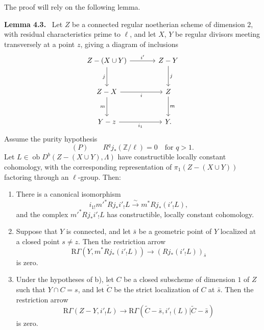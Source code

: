 \documentclass[11pt]{article}
\newenvironment{statement}[1]{\par\medskip\noindent\textbf{#1.}\ }{\par\medskip}
\providecommand{\Ob}{\operatorname{ob}}
\providecommand{\Ob}{\operatorname{ob}}
\providecommand{\Ob}{\operatorname{Ob}}
\providecommand{\Ob}{\operatorname{ob}}
\providecommand{\Ob}{\operatorname{Ob}}
\begin{document}
The proof will rely on the following lemma.

\label{sga5:IIIB:lemma:4.3}\begin{statement}{Lemma 4.3}
Let $Z$ be a connected regular noetherian scheme of dimension $2$, with residual characteristics prime to $\ell$, and let $X$, $Y$ be regular divisors meeting transversely at a point $z$, giving a diagram of inclusions
\[
\begin{tikzcd}[column sep=large,row sep=large]
Z-(X\cup Y) \arrow[r,"i'"] \arrow[d,"j"'] & Z-Y \arrow[d,"j"]\\
Z-X \arrow[r,"i"'] \arrow[d,"m"'] & Z \arrow[d,"m"]\\
Y-z \arrow[r,"i_1"'] & Y .
\end{tikzcd}
\]
Assume the purity hypothesis
\[
(P)\qquad R^qj_*(\mathbb Z/\ell)=0\quad\text{for }q>1.
\]
Let $L\in\Ob D^b(Z-(X\cup Y),\Lambda)$ have constructible locally constant cohomology, with the corresponding representation of $\pi_1(Z-(X\cup Y))$ factoring through an $\ell$-group. Then:
\begin{enumerate}[label=\alph*)]
\item There is a canonical isomorphism
\[
i_{1!}m'^*Rj_*i'_!L\xrightarrow{\sim} m^*Rj_*(i'_!L),
\]
and the complex $m'^*Rj_*i'_!L$ has constructible, locally constant cohomology.
\item Suppose that $Y$ is connected, and let $\bar s$ be a geometric point of $Y$ localized at a closed point $s\ne z$. Then the restriction arrow
\begin{equation}
\mathrm R\Gamma(Y,m^*Rj_*(i'_!L))\longrightarrow (Rj_*(i'_!L))_{\bar s}
\tag{4.3.1}\label{sga5:IIIB:equation:4.3.1}
\end{equation}
is zero.
\item Under the hypotheses of b), let $C$ be a closed subscheme of dimension $1$ of $Z$ such that $Y\cap C=s$, and let $\widetilde C$ be the strict localization of $C$ at $\bar s$. Then the restriction arrow
\begin{equation}
\mathrm R\Gamma(Z-Y,i'_!L)
\longrightarrow
\mathrm R\Gamma(\widetilde C-\bar s,i'_!(L)|\widetilde C-\bar s)
\tag{4.3.2}\label{sga5:IIIB:equation:4.3.2}
\end{equation}
is zero.
\end{enumerate}
\end{statement}
\end{document}
